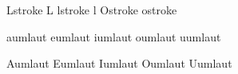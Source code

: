  Lstroke          {L}
 lstroke          {l}
 Ostroke          { } %
 ostroke          { } %

 aumlaut          {\moveaccent{-.1ex}\adiaeresis}
 eumlaut          {\moveaccent{-.1ex}\ediaeresis}
 iumlaut          {\moveaccent{-.1ex}\idiaeresis}
 oumlaut          {\moveaccent{-.1ex}\odiaeresis}
 uumlaut          {\moveaccent{-.1ex}\udiaeresis}

 Aumlaut          {\smashaccent\Adiaeresis}
 Eumlaut          {\smashaccent\Ediaeresis}
 Iumlaut          {\smashaccent\Idiaeresis}
 Oumlaut          {\smashaccent\Odiaeresis}
 Uumlaut          {\smashaccent\Udiaeresis}

\stopencoding


\def\eszett  {\ssharp}
\def\Eszett  {\Ssharp}

\def\lslash  {\lstroke}
\def\Lslash  {\Lstroke}
\def\dslash  {\dstroke}
\def\Dslash  {\Dstroke}
\def\oslash  {\ostroke}
\def\Oslash  {\Ostroke}


\def\S       {\sectionmark  }
\def\P       {\paragraphmark}


\def\textS   {\sectionmark  }
\def\textP   {\paragraphmark}


\def\florin  {\textflorin  }  \def\florijn{\textflorin}
\def\dollar  {\textdollar  }
\def\pound   {\textsterling}
\def\sterling{\textsterling}


\def\promille{\perthousand}
\def\permille{\perthousand}
\def\procent {\percent }
\def\permine {\fakepermine}


\def\hyphen  {\softhyphen}
\def\cwm     {\compoundwordmark}


\def\lowerleftsingleninequote  {\quotesinglebase}
\def\lowerleftdoubleninequote  {\quotedblbase}      
\def\lowerrightsingleninequote {\quotesinglebase}   
\def\lowerrightdoubleninequote {\quotedblbase}      

\def\upperleftsingleninequote  {\quoteright}
\def\upperleftdoubleninequote  {\quotedblright}     
\def\upperrightsingleninequote {\quoteright}
\def\upperrightdoubleninequote {\quotedblright}     

